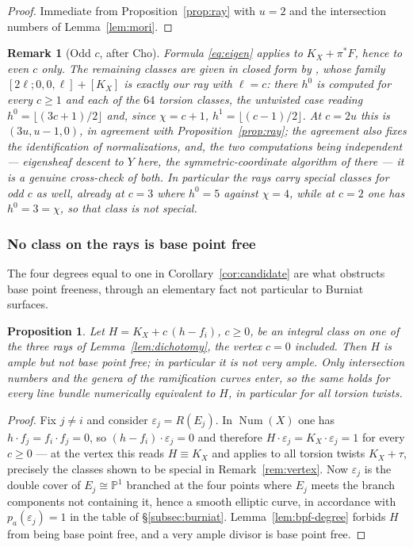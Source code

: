 \documentclass[10pt,a4paper]{amsart}
\newtheorem{proposition}[theorem]{Proposition}
\newtheorem{remark}[theorem]{Remark}
\newcommand{\PP}{\mathbb{P}}
\newcommand{\Num}{\operatorname{Num}}
\begin{document}
\begin{proof}
Immediate from Proposition~\ref{prop:ray} with $u=2$ and the intersection numbers of Lemma~\ref{lem:mori}.
\end{proof}

\begin{remark}[Odd $c$, after Cho]\label{subsubsec:cho-rays}
Formula \eqref{eq:eigen} applies to $K_X+\pi^*F$, hence to even $c$ only. The remaining classes are given in closed form by \cite[Prop.~4.27]{Cho26}, whose family $[2\ell;0,0,\ell]+[K_X]$ is exactly our ray with $\ell=c$: there $h^0$ is computed for every $c\ge1$ and each of the $64$ torsion classes, the untwisted case reading $h^0=\lfloor(3c+1)/2\rfloor$ and, since $\chi=c+1$, $h^1=\lfloor(c-1)/2\rfloor$. At $c=2u$ this is $(3u,u-1,0)$, in agreement with Proposition~\ref{prop:ray}; the agreement also fixes the identification of normalizations, and, the two computations being independent --- eigensheaf descent to $Y$ here, the symmetric-coordinate algorithm of \cite{Cho26} there --- it is a genuine cross-check of both. In particular the rays carry special classes for odd $c$ as well, already at $c=3$ where $h^0=5$ against $\chi=4$, while at $c=2$ one has $h^0=3=\chi$, so that class is not special.
\end{remark}

\subsubsection{No class on the rays is base point free}
The four degrees equal to one in Corollary~\ref{cor:candidate} are what obstructs base point freeness, through an elementary fact not particular to Burniat surfaces.

\begin{proposition}\label{prop:notva}
Let $H=K_X+c\,(h-f_i)$, $c\ge0$, be an integral class on one of the three rays of Lemma~\ref{lem:dichotomy}, the vertex $c=0$ included. Then $H$ is ample but \emph{not} base point free; in particular it is not very ample. Only intersection numbers and the genera of the ramification curves enter, so the same holds for every line bundle numerically equivalent to $H$, in particular for all torsion twists.
\end{proposition}

\begin{proof}
Fix $j\neq i$ and consider $\varepsilon_j=R(E_j)$. In $\Num(X)$ one has $h\cdot f_j=f_i\cdot f_j=0$, so $(h-f_i)\cdot\varepsilon_j=0$ and therefore $H\cdot\varepsilon_j=K_X\cdot\varepsilon_j=1$ for every $c\ge0$ --- at the vertex this reads $H\equiv K_X$ and applies to all torsion twists $K_X+\tau$, precisely the classes shown to be special in Remark~\ref{rem:vertex}. Now $\varepsilon_j$ is the double cover of $E_j\cong\PP^1$ branched at the four points where $E_j$ meets the branch components not containing it, hence a smooth elliptic curve, in accordance with $p_a(\varepsilon_j)=1$ in the table of \S\ref{subsec:burniat}. Lemma~\ref{lem:bpf-degree} forbids $H$ from being base point free, and a very ample divisor is base point free.
\end{proof}
\end{document}
